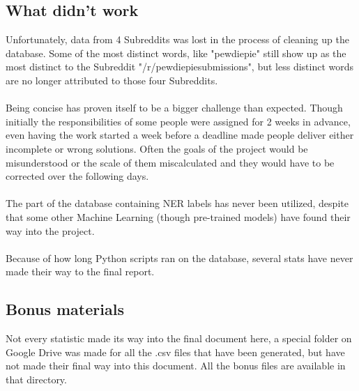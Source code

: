 \documentclass[openany]{article}
\begin{document}
\subsection{What didn't work}
Unfortunately, data from 4 Subreddits was lost in the process of cleaning up the database. Some of the most distinct words, like "pewdiepie" still show up as the most distinct to the Subreddit "/r/pewdiepiesubmissions", but less distinct words are no longer attributed to those four Subreddits. \\ \\
Being concise has proven itself to be a bigger challenge than expected. Though initially the responsibilities of some people were assigned for 2 weeks in advance, even having the work started a week before a deadline made people deliver either incomplete or wrong solutions. Often the goals of the project would be misunderstood or the scale of them miscalculated and they would have to be corrected over the following days.\\ \\
The part of the database containing NER labels has never been utilized, despite that some other Machine Learning (though pre-trained models) have found their way into the project\cite{sentimentanalysis}\cite{emotions}\cite{wordnet}.\\ \\
Because of how long Python scripts ran on the database, several stats have never made their way to the final report.

\subsection{Bonus materials}
Not every statistic made its way into the final document here, a special folder on Google Drive\cite{bonusmaterials} was made for all the .csv files that have been generated, but have not made their final way into this document. All the bonus files are available in that directory.
\end{document}
